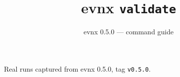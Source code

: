 \documentclass[aspectratio=169,10pt]{beamer}
\title{evnx \texttt{validate}}
\subtitle{evnx 0.5.0 — command guide}
\date{}
\begin{document}
\begin{frame}[plain]\titlepage
  \begin{center}\footnotesize
  \textcolor{evnxMuted}{Real runs captured from evnx 0.5.0, tag \texttt{v0.5.0}.}
  \end{center}
\end{frame}

\end{document}
